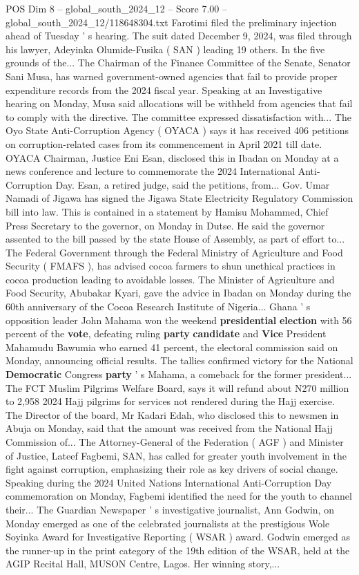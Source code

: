 \begin{textsample}{POS Dim 8 – global\_south\_2024\_12 – Score 7.00 – global\_south\_2024\_12/118648304.txt}
Farotimi filed the preliminary injection ahead of Tuesday ' s hearing.
The suit dated December 9, 2024, was filed through his lawyer, Adeyinka Olumide-Fusika ( SAN ) leading 19 others.
In the five grounds of the...
The Chairman of the Finance Committee of the Senate, Senator Sani Musa, has warned government-owned agencies that fail to provide proper expenditure records from the 2024 fiscal year.
Speaking at an Investigative hearing on Monday, Musa said allocations will be withheld from agencies that fail to comply with the directive.
The committee expressed dissatisfaction with...
The Oyo State Anti-Corruption Agency ( OYACA ) says it has received 406 petitions on corruption-related cases from its commencement in April 2021 till date.
OYACA Chairman, Justice Eni Esan, disclosed this in Ibadan on Monday at a news conference and lecture to commemorate the 2024 International Anti-Corruption Day.
Esan, a retired judge, said the petitions, from...
Gov.
Umar Namadi of Jigawa has signed the Jigawa State Electricity Regulatory Commission bill into law.
This is contained in a statement by Hamisu Mohammed, Chief Press Secretary to the governor, on Monday in Dutse.
He said the governor assented to the bill passed by the state House of Assembly, as part of effort to...
The Federal Government through the Federal Ministry of Agriculture and Food Security ( FMAFS ), has advised cocoa farmers to shun unethical practices in cocoa production leading to avoidable losses.
The Minister of Agriculture and Food Security, Abubakar Kyari, gave the advice in Ibadan on Monday during the 60th anniversary of the Cocoa Research Institute of Nigeria...
Ghana ' s opposition leader John Mahama won the weekend \textbf{presidential} \textbf{election} with 56 percent of the \textbf{vote}, defeating ruling \textbf{party} \textbf{candidate} and \textbf{Vice} President Mahamudu Bawumia who earned 41 percent, the electoral commission said on Monday, announcing official results.
The tallies confirmed victory for the National \textbf{Democratic} Congress \textbf{party} ' s Mahama, a comeback for the former president...
The FCT Muslim Pilgrims Welfare Board, says it will refund about N270 million to 2,958 2024 Hajj pilgrims for services not rendered during the Hajj exercise.
The Director of the board, Mr Kadari Edah, who disclosed this to newsmen in Abuja on Monday, said that the amount was received from the National Hajj Commission of...
The Attorney-General of the Federation ( AGF ) and Minister of Justice, Lateef Fagbemi, SAN, has called for greater youth involvement in the fight against corruption, emphasizing their role as key drivers of social change.
Speaking during the 2024 United Nations International Anti-Corruption Day commemoration on Monday, Fagbemi identified the need for the youth to channel their...
The Guardian Newspaper ' s investigative journalist, Ann Godwin, on Monday emerged as one of the celebrated journalists at the prestigious Wole Soyinka Award for Investigative Reporting ( WSAR ) award.
Godwin emerged as the runner-up in the print category of the 19th edition of the WSAR, held at the AGIP Recital Hall, MUSON Centre, Lagos.
Her winning story,...


\end{textsample}
